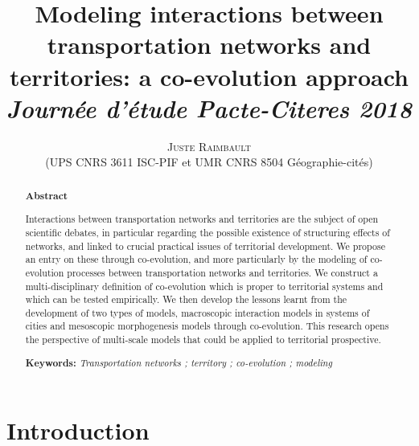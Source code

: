 \documentclass[11pt]{article}
\newcommand{\noun}[1]{\textsc{#1}}
\begin{document}
\title{\vspace{-2cm}
Modeling interactions between transportation networks and territories: a co-evolution approach
\bigskip\\
\textit{Journée d'étude Pacte-Citeres 2018\\
}
}
\author{\noun{Juste Raimbault}\medskip\\
(UPS CNRS 3611 ISC-PIF et UMR CNRS 8504 Géographie-cités)\\
}
\date{}

\maketitle

\justify





\medskip


\renewcommand{\abstractname}{}
\begin{abstract}
	\begin{center}
	\textbf{Abstract}
	\end{center}
	
	\medskip
	
	Interactions between transportation networks and territories are the subject of open scientific debates, in particular regarding the possible existence of structuring effects of networks, and linked to crucial practical issues of territorial development. We propose an entry on these through co-evolution, and more particularly by the modeling of co-evolution processes between transportation networks and territories. We construct a multi-disciplinary definition of co-evolution which is proper to territorial systems and which can be tested empirically. We then develop the lessons learnt from the development of two types of models, macroscopic interaction models in systems of cities and mesoscopic morphogenesis models through co-evolution. This research opens the perspective of multi-scale models that could be applied to territorial prospective.
	
	\medskip
	
	\textbf{Keywords: }\textit{Transportation networks ; territory ; co-evolution ; modeling}
	
\end{abstract}



\section{Introduction}
\end{document}
